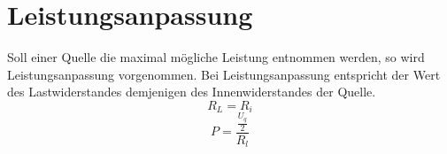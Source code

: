 



\section{Leistungsanpassung}
Soll einer Quelle die maximal mögliche Leistung entnommen werden, so wird 
Leistungsanpassung vorgenommen. Bei Leistungsanpassung entspricht der Wert des 
Lastwiderstandes demjenigen des Innenwiderstandes der Quelle. 
\[ R_L = R_i \]
\[ P = \frac{\frac{U_q}{2}}{R_l} \]